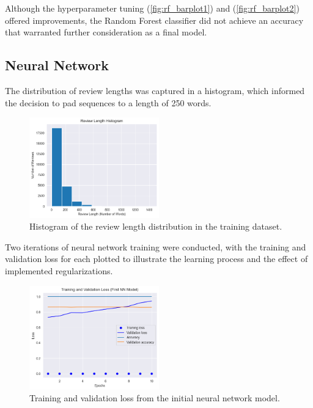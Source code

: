 \documentclass[conference]{IEEEtran}
\begin{document}
	Although the hyperparameter tuning (\ref{fig:rf_barplot1}) and (\ref{fig:rf_barplot2}) offered improvements, the Random Forest classifier did not achieve an accuracy that warranted further consideration as a final model.
	
	\subsection{Neural Network}
	The distribution of review lengths was captured in a histogram, which informed the decision to pad sequences to a length of 250 words.
	
	\begin{figure}[htbp]
		\centering
		\includegraphics[width=0.5\textwidth]{review_length_histogram.png}
		\caption{Histogram of the review length distribution in the training dataset.}
		\label{fig:review_length_histogram}
	\end{figure}
	
	Two iterations of neural network training were conducted, with the training and validation loss for each plotted to illustrate the learning process and the effect of implemented regularizations.
	
	\begin{figure}[htbp]
		\centering
		\includegraphics[width=0.5\textwidth]{nn_loss_plot1.png}
		\caption{Training and validation loss from the initial neural network model.}
		\label{fig:nn_loss_plot1}
	\end{figure}
	
\end{document}
